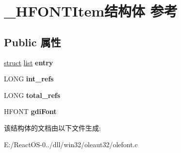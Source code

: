 \hypertarget{struct___h_f_o_n_t_item}{}\section{\+\_\+\+H\+F\+O\+N\+T\+Item结构体 参考}
\label{struct___h_f_o_n_t_item}
\subsection*{Public 属性}
\begin{DoxyCompactItemize}
\item 
\mbox{\label{struct___h_f_o_n_t_item_aeb1514c77e015d4eeb8f075dc1c58cc9}} 
\hyperlink{interfacestruct}{struct} \hyperlink{classlist}{list} {\bfseries entry}
\item 
\mbox{\label{struct___h_f_o_n_t_item_a939f5a433879b0241660a08806b20c9a}} 
L\+O\+NG {\bfseries int\+\_\+refs}
\item 
\mbox{\label{struct___h_f_o_n_t_item_abd32e5c9df86c9107625391a8449955a}} 
L\+O\+NG {\bfseries total\+\_\+refs}
\item 
\mbox{\label{struct___h_f_o_n_t_item_a18b3c19eb104f77483123793908821c7}} 
H\+F\+O\+NT {\bfseries gdi\+Font}
\end{DoxyCompactItemize}


该结构体的文档由以下文件生成\+:\begin{DoxyCompactItemize}
\item 
E\+:/\+React\+O\+S-\/0../dll/win32/oleaut32/olefont.\+c\end{DoxyCompactItemize}
